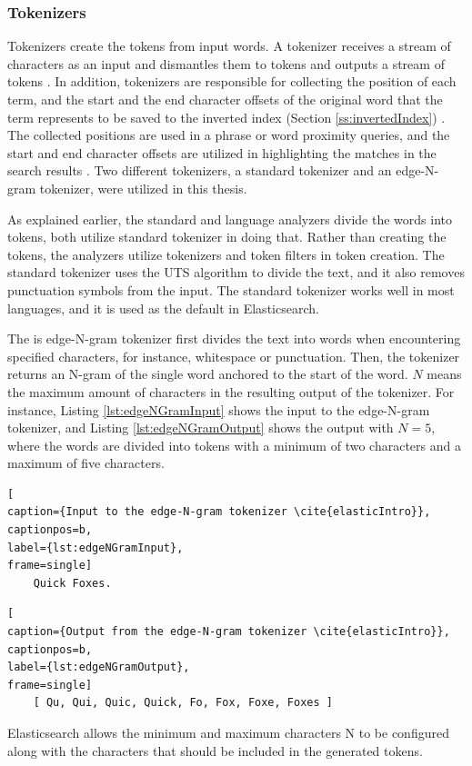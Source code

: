 \subsubsection{Tokenizers}


Tokenizers create the tokens from input words.
A tokenizer receives a stream of characters as an input and dismantles them to tokens and outputs a stream
of tokens \cite{elasticIntro}.
In addition, tokenizers are responsible for collecting the position of each term, and the start 
and the end character offsets of the original word that the term represents 
to be saved to the inverted index (Section \ref{ss:invertedIndex}) \cite{elasticIntro}.
The collected positions are used in a phrase or word proximity queries, and 
the start and end character offsets are utilized in highlighting the matches in the
search results \cite{elasticIntro}.
Two different tokenizers, a standard tokenizer and 
an edge-N-gram tokenizer, were utilized in this thesis.


As explained earlier, the standard and language analyzers divide the words into tokens,
both utilize standard tokenizer in doing that. 
Rather than creating the tokens, the analyzers utilize tokenizers and token filters in token creation.
The standard tokenizer uses the UTS algorithm to divide the text,
and it also removes punctuation symbols from the input.
The standard tokenizer works well in most languages, and it is used as the default in Elasticsearch.
\cite{elasticIntro}


The is edge-N-gram tokenizer first divides the text into words when encountering
specified characters, for instance, whitespace or punctuation. 
Then, the tokenizer returns an N-gram of the single word anchored to the start of the word.
$N$ means the maximum amount of characters in the resulting output of the tokenizer.
For instance, Listing \ref{lst:edgeNGramInput} shows the input to the edge-N-gram tokenizer, and
Listing \ref{lst:edgeNGramOutput} shows the output with $N = 5$, where the words are divided into tokens 
with a minimum of two characters and a maximum of five characters.
\begin{lstlisting}[
caption={Input to the edge-N-gram tokenizer \cite{elasticIntro}},
captionpos=b,
label={lst:edgeNGramInput},
frame=single]
    Quick Foxes.
\end{lstlisting}
\begin{lstlisting}[
caption={Output from the edge-N-gram tokenizer \cite{elasticIntro}},
captionpos=b,
label={lst:edgeNGramOutput},
frame=single]
    [ Qu, Qui, Quic, Quick, Fo, Fox, Foxe, Foxes ]
\end{lstlisting}
Elasticsearch allows the minimum and maximum characters N to be configured along with the characters 
that should be included in the generated tokens.
\cite{elasticIntro}


